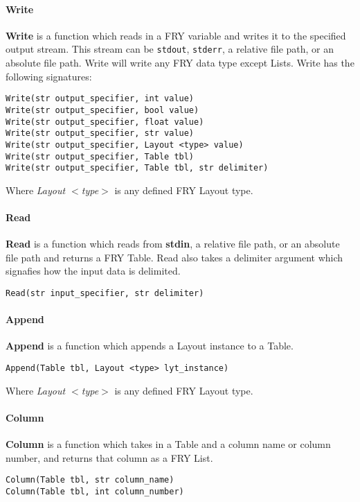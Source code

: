 \documentclass{article}
\begin{document}
\paragraph{Write}
\textbf{Write} is a function which reads in a FRY variable and writes it to the specified output stream. This stream can be \texttt{stdout}, \texttt{stderr}, a relative file path, or an absolute file path. Write will write any FRY data type except Lists. Write has the following signatures:
\begin{lstlisting}
Write(str output_specifier, int value)
Write(str output_specifier, bool value)
Write(str output_specifier, float value)
Write(str output_specifier, str value)
Write(str output_specifier, Layout <type> value)
Write(str output_specifier, Table tbl)
Write(str output_specifier, Table tbl, str delimiter)
\end{lstlisting}
Where \emph{Layout $<$type$>$} is any defined FRY Layout type.
   
\paragraph{Read}
\textbf{Read} is a function which reads from \textbf{stdin}, a relative file path, or an absolute file path and returns a FRY Table. Read also takes a delimiter argument which signafies how the input data is delimited.
\begin{lstlisting}
Read(str input_specifier, str delimiter)
\end{lstlisting}

\paragraph{Append}
\textbf{Append} is a function which appends a Layout instance to a Table.
\begin{lstlisting}
Append(Table tbl, Layout <type> lyt_instance)
\end{lstlisting}
Where \emph{Layout $<$type$>$} is any defined FRY Layout type.

\paragraph{Column}
\textbf{Column} is a function which takes in a Table and a column name or column number, and returns that column as a FRY List.
\begin{lstlisting}
Column(Table tbl, str column_name)
Column(Table tbl, int column_number)
\end{lstlisting}
\end{document}
